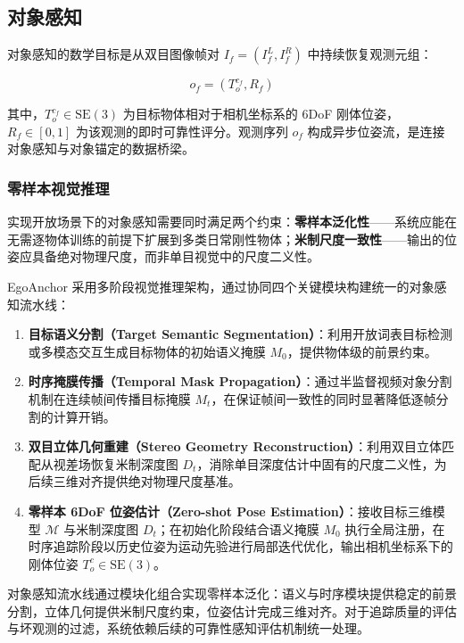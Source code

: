 \documentclass[9pt,twocolumn,letterpaper]{extarticle}
\begin{document}
\subsection{对象感知}\label{sec:perception}


对象感知的数学目标是从双目图像帧对 $I_f = (I_f^L, I_f^R)$ 中持续恢复观测元组：

\begin{equation}
o_f = (T_o^{c_f}, R_f)
\label{eq:observation}
\end{equation}


其中，$T_o^{c_f} \in \mathrm{SE}(3)$ 为目标物体相对于相机坐标系的 6DoF 刚体位姿，$R_f \in [0,1]$ 为该观测的即时可靠性评分。观测序列 ${o_f}$ 构成异步位姿流，是连接对象感知与对象锚定的数据桥梁。

\subsubsection{零样本视觉推理}\label{sec:pipeline-detail}


实现开放场景下的对象感知需要同时满足两个约束：\textbf{零样本泛化性}------系统应能在无需逐物体训练的前提下扩展到多类日常刚性物体；\textbf{米制尺度一致性}------输出的位姿应具备绝对物理尺度，而非单目视觉中的尺度二义性。

EgoAnchor 采用多阶段视觉推理架构，通过协同四个关键模块构建统一的对象感知流水线：

\begin{enumerate}
  \item \textbf{目标语义分割（Target Semantic Segmentation）}：利用开放词表目标检测或多模态交互生成目标物体的初始语义掩膜 $M_0$，提供物体级的前景约束。
  \item \textbf{时序掩膜传播（Temporal Mask Propagation）}：通过半监督视频对象分割机制在连续帧间传播目标掩膜 $M_t$，在保证帧间一致性的同时显著降低逐帧分割的计算开销。
  \item \textbf{双目立体几何重建（Stereo Geometry Reconstruction）}：利用双目立体匹配从视差场恢复米制深度图 $D_t$，消除单目深度估计中固有的尺度二义性，为后续三维对齐提供绝对物理尺度基准。
  \item \textbf{零样本 6DoF 位姿估计（Zero-shot Pose Estimation）}：接收目标三维模型 $\mathcal{M}$ 与米制深度图 $D_t$；在初始化阶段结合语义掩膜 $M_0$ 执行全局注册，在时序追踪阶段以历史位姿为运动先验进行局部迭代优化，输出相机坐标系下的刚体位姿 $T_o^c \in \mathrm{SE}(3)$。
\end{enumerate}

对象感知流水线通过模块化组合实现零样本泛化：语义与时序模块提供稳定的前景分割，立体几何提供米制尺度约束，位姿估计完成三维对齐。对于追踪质量的评估与坏观测的过滤，系统依赖后续的可靠性感知评估机制统一处理。
\end{document}
